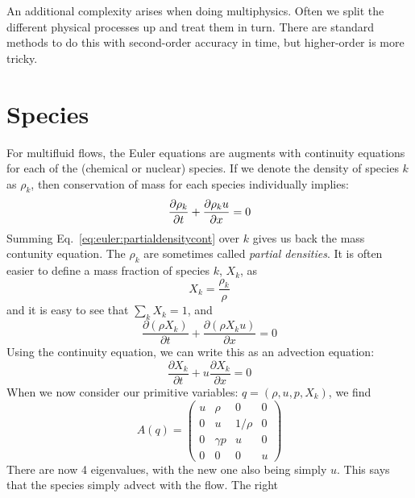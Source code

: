 An additional complexity arises when doing multiphysics.  Often we
split the different physical processes up and treat them in turn.
There are standard methods to do this with second-order accuracy in time,
but higher-order is more tricky.


\section{Species}

For multifluid flows, the Euler equations are
augments with continuity equations for each of the (chemical or nuclear)
species.  If we denote the density of species $k$ as $\rho_k$, then conservation
of mass for each species individually implies:
\begin{equation}
\label{eq:euler:partialdensitycont}
{\frac{{\partial\rho_k}}{\partial t}} + {\frac{{\partial\rho_k u}}{\partial x}} = 0
\end{equation}
Summing Eq.~\ref{eq:euler:partialdensitycont} over $k$ gives us back
the mass contunity equation.  The $\rho_k$ are sometimes called {\em
  partial densities}.  It is often easier to define a mass fraction of species $k$,
$X_k$, as
\begin{equation}
X_k = \frac{\rho_k}{\rho}
\end{equation}
and it is easy to see that $\sum_k X_k = 1$, and 
\begin{equation}
\frac{\partial (\rho X_k)}{\partial t} + \frac{\partial (\rho X_k u)}{\partial x} = 0
\end{equation}
Using the
continuity equation, we can write this as an advection equation:
\begin{equation}
\frac{\partial X_k}{\partial t} + u \frac{\partial X_k}{\partial x} = 0
\end{equation}
When we now consider our primitive variables: $q = (\rho, u, p, X_k)$,
we find
\begin{equation}
A(q) = \left ( \begin{array}{cccc} u  & \rho     & 0      &  0\\
                                  0  &  u       & 1/\rho &  0\\
                                  0  & \gamma p & u      &  0\\
                                  0  & 0        & 0      & u \end{array} \right )
\end{equation}
There are now 4 eigenvalues, with the new one also being simply $u$.
This says that the species simply advect with the flow.  The right
